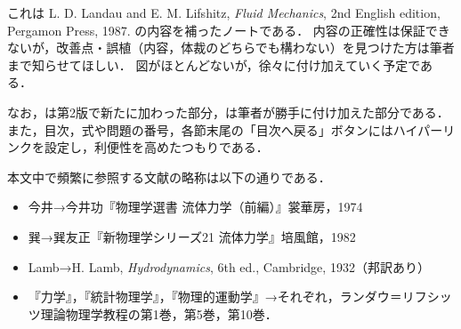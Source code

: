 これは
L. D. Landau and E. M. Lifshitz, \textit{Fluid Mechanics}, 2nd English edition, Pergamon Press, 1987.
の内容を補ったノートである．
内容の正確性は保証できないが，改善点・誤植（内容，体裁のどちらでも構わない）を見つけた方は筆者まで知らせてほしい．
図がほとんどないが，徐々に付け加えていく予定である．

なお，\spade は第2版で新たに加わった部分，\spade\spade は筆者が勝手に付け加えた部分である．
また，目次，式や問題の番号，各節末尾の「目次へ戻る」ボタンにはハイパーリンクを設定し，利便性を高めたつもりである．

本文中で頻繁に参照する文献の略称は以下の通りである．
\begin{itemize}
    \item 今井→今井功『物理学選書\; 流体力学（前編）』裳華房，1974
    \item 巽→巽友正『新物理学シリーズ21 流体力学』培風館，1982
    \item Lamb→H. Lamb, \textit{Hydrodynamics}, 6th ed., Cambridge, 1932（邦訳あり）
    \item 『力学』，『統計物理学』，『物理的運動学』→それぞれ，ランダウ＝リフシッツ理論物理学教程の第1巻，第5巻，第10巻．
\end{itemize}